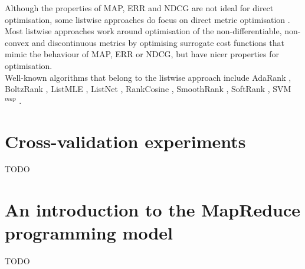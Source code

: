Although the properties of \ac{MAP}, \ac{ERR} and \ac{NDCG} are not ideal for direct optimisation, some listwise approaches do focus on direct metric optimisation \cite{Yue2007, Taylor2008, Chapelle2010}. Most listwise approaches work around optimisation of the non-differentiable, non-convex and discontinuous metrics by optimising surrogate cost functions that mimic the behaviour of \ac{MAP}, \ac{ERR} or \ac{NDCG}, but have nicer properties for optimisation.\\

Well-known algorithms that belong to the listwise approach include AdaRank \cite{Xu2007}, BoltzRank \cite{Volkovs2009}, ListMLE \cite{Xia2008}, ListNet \cite{Cao2007}, RankCosine \cite{Qin2008}, SmoothRank \cite{Chapelle2010}, SoftRank \cite{Taylor2008}, \acs{SVM}$^{map}$ \cite{Yue2007}.

\section{Cross-validation experiments}
TODO

\section{An introduction to the MapReduce programming model}
TODO